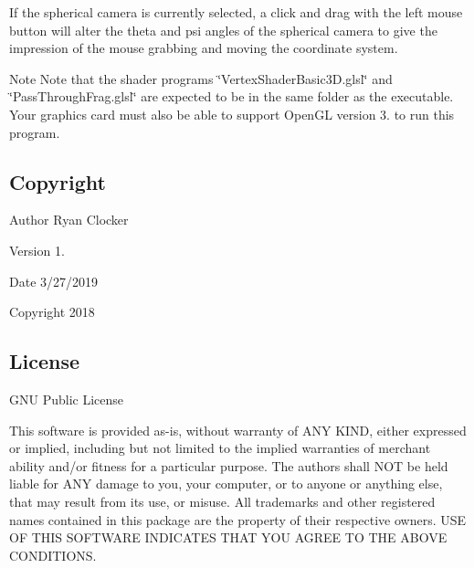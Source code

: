 If the spherical camera is currently selected, a click and drag with the left mouse button will alter the theta and psi angles of the spherical camera to give the impression of the mouse grabbing and moving the coordinate system.

\begin{DoxyNote}{Note}
Note that the shader programs \char`\"{}\+Vertex\+Shader\+Basic3\+D.\+glsl\char`\"{} and \char`\"{}\+Pass\+Through\+Frag.\+glsl\char`\"{} are expected to be in the same folder as the executable. Your graphics card must also be able to support Open\+GL version 3. to run this program.
\end{DoxyNote}


\hypertarget{index_copyright}{}\subsection{Copyright}\label{index_copyright}
\begin{DoxyAuthor}{Author}
Ryan Clocker 
\end{DoxyAuthor}
\begin{DoxyVersion}{Version}
1. 
\end{DoxyVersion}
\begin{DoxyDate}{Date}
3/27/2019 
\end{DoxyDate}
\begin{DoxyCopyright}{Copyright}
2018
\end{DoxyCopyright}


\hypertarget{index_license}{}\subsection{License}\label{index_license}
G\+NU Public License

This software is provided as-\/is, without warranty of A\+NY K\+I\+ND, either expressed or implied, including but not limited to the implied warranties of merchant ability and/or fitness for a particular purpose. The authors shall N\+OT be held liable for A\+NY damage to you, your computer, or to anyone or anything else, that may result from its use, or misuse. All trademarks and other registered names contained in this package are the property of their respective owners. U\+SE OF T\+H\+IS S\+O\+F\+T\+W\+A\+RE I\+N\+D\+I\+C\+A\+T\+ES T\+H\+AT Y\+OU A\+G\+R\+EE TO T\+HE A\+B\+O\+VE C\+O\+N\+D\+I\+T\+I\+O\+NS. 